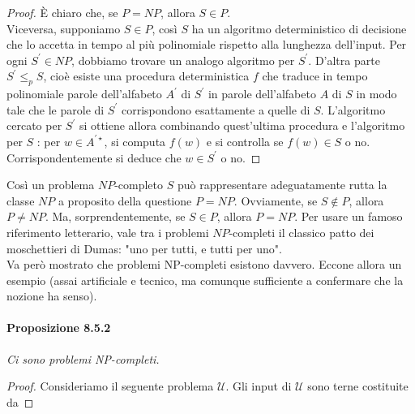 \begin{proof}
    È chiaro che, se $P=N P$, allora $S \in P$.\\
    Viceversa, supponiamo $S \in P$, così $S$ ha un algoritmo deterministico di
    decisione che lo accetta in tempo al più polinomiale rispetto alla lunghezza
    dell'input. Per ogni $S^{\prime} \in N P$, dobbiamo trovare un analogo
    algoritmo per $S^{\prime}$. D'altra parte $S^{\prime} \leq_p S$, cioè esiste una
    procedura deterministica $f$ che traduce in tempo polinomiale parole
    dell'alfabeto $A^{\prime}$ di $S^{\prime}$ in parole dell'alfabeto $A$ di
    $S$ in modo tale che le parole di $S^{\prime}$ corrispondono esattamente a
    quelle di $S$. L'algoritmo cercato per $S^{\prime}$ si ottiene allora
    combinando quest'ultima procedura e l'algoritmo per $S$ : per $w \in
        A^{\prime \star}$, si computa $f(w)$ e si controlla se $f(w) \in S$ o no.
    Corrispondentemente si deduce che $w \in S^{\prime}$ o no.
\end{proof}

Così un problema $N P$-completo $S$ può rappresentare adeguatamente rutta la
classe $N P$ a proposito della questione $P=N P$. Ovviamente, se $S \notin  P$,
allora $P \neq N P$. Ma, sorprendentemente, se $S \in P$, allora $P=N P$. Per
usare un famoso riferimento letterario, vale tra i problemi $N P$-completi il
classico patto dei moschettieri di Dumas: "uno per tutti, e tutti per uno".\\
Va però mostrato che problemi NP-completi esistono davvero. Eccone allora un
esempio (assai artificiale e tecnico, ma comunque sufficiente a confermare che
la nozione ha senso).

\paragraph{Proposizione 8.5.2} \textit{Ci sono problemi NP-completi.}

\begin{proof}
    Consideriamo il seguente problema $\mathcal{U}$. Gli input di $\mathcal{U}$
    sono terne costituite da
\end{proof}